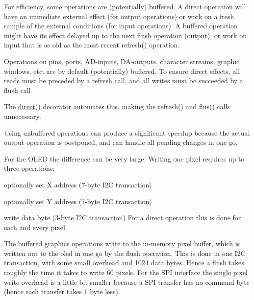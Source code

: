 For efficiency, some operations are (potentially) buffered. A direct operation will have an immediate external effect (for output operations) or work on a fresh sample of the external conditions (for input operations). A buffered operation might have its effect delayed up to the next flush operation (output), or work on input that is as old as the most recent refresh() operation.

Operations on pins, ports, A\+D-\/inputs, D\+A-\/outputs, character streams, graphic windows, etc. are by default (potentially) buffered. To ensure direct effects, all reads must be preceded by a refresh call, and all writes must be succeeded by a flush call


\begin{DoxyCodeInclude}
\end{DoxyCodeInclude}
 The \hyperlink{namespacehwlib_a43941b7f246ad934ee43dbfa0f5c8b5a}{direct()} decorator automates this, making the refresh() and flus() calls unnecessary.


\begin{DoxyCodeInclude}
\end{DoxyCodeInclude}
 Using unbuffered operations can produce a significant speedup because the actual output operation is postponed, and can handle all pending changes in one go.


\begin{DoxyCodeInclude}
\end{DoxyCodeInclude}
 For the O\+L\+ED the difference can be very large. Writing one pixel requires up to three operations\+:
\begin{DoxyItemize}
\item optionally set X address (7-\/byte I2C transaction)
\item optionally set Y address (7-\/byte I2C transaction)
\item write data byte (3-\/byte I2C transaction) For a direct operation this is done for each and every pixel.
\end{DoxyItemize}

The buffered graphics operations write to the in-\/memory pixel buffer, which is written out to the oled in one go by the flush operation. This is done in one I2C transaction, with some small overhead and 1024 data bytes. Hence a flush takes roughly the time it takes to write 60 pixels. For the S\+PI interface the single pixel write overhead is a little bit smaller because a S\+PI transfer has no command byte (hence each transfer takes 1 byte less).


